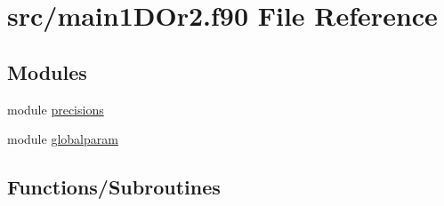 \hypertarget{main1DOr2_8f90}{}\section{src/main1\+D\+Or2.f90 File Reference}
\label{main1DOr2_8f90}
\subsection*{Modules}
\begin{DoxyCompactItemize}
\item 
module \mbox{\hyperlink{namespaceprecisions}{precisions}}
\item 
module \mbox{\hyperlink{namespaceglobalparam}{globalparam}}
\end{DoxyCompactItemize}
\subsection*{Functions/\+Subroutines}
